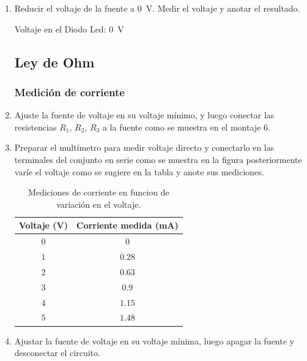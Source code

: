 \documentclass{article}
\begin{document}
\begin{enumerate}
        Voltaje en el Diodo Led: \SI{1.9}{\volt}
        
        \item Reducir el voltaje de la fuente a \SI{0}{\volt}. Medir el voltaje y anotar el resultado.
        
        Voltaje en el Diodo Led: \SI{0}{\volt}

        \subsection*{Ley de Ohm}
        \subsubsection*{Medición de corriente}
        \item Ajuste la fuente de voltaje en su voltaje mínimo, y luego conectar las resistencias $R_1$, $R_2$, $R_3$ a la fuente como se muestra en el montaje 6.
        

        \item Preparar el multímetro para medir voltaje directo y conectarlo en las terminales del conjunto en serie como se muestra en la figura posteriormente varíe el voltaje como se sugiere en la tabla y anote sus mediciones.
        

        \begin{table}[ht]
            \centering
            \begin{tabular}{|c|c|} %
                \midrule
                Voltaje (\unit{\volt}) & Corriente medida (\unit{\milli\ampere}) \\
                \midrule
                $0$ & $0$       \\
                $1$ & $0.28$    \\
                $2$ & $0.63$    \\
                $3$ & $0.9$     \\
                $4$ & $1.15$    \\
                $5$ & $1.48$    \\
                \midrule
            \end{tabular}
            \caption{Mediciones de corriente en funcion de variación en el voltaje.}\label{tabla:5}
        \end{table}

        \item Ajustar la fuente de voltaje en su voltaje mínima, luego apagar la fuente y desconectar el circuito.
        
    \end{enumerate}
\end{document}
